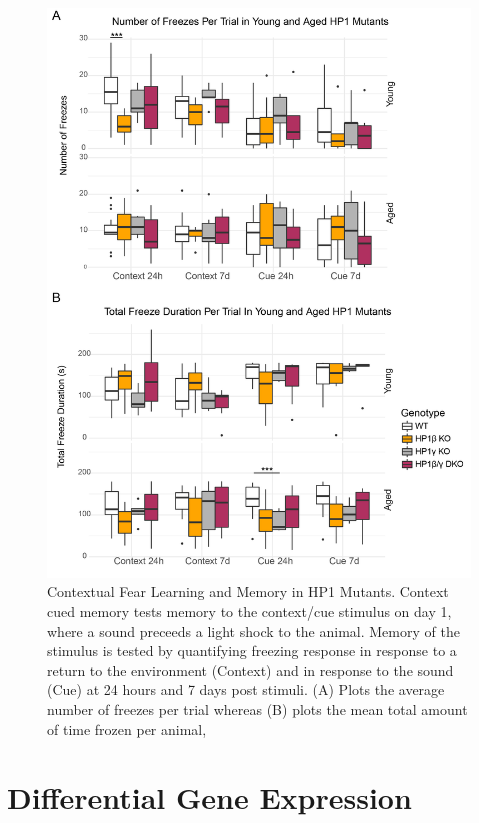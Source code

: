 \documentclass[onehalf,12pt]{beavtex}
\begin{document}
  \begin{figure}
  
  {\centering \includegraphics[width=0.95\linewidth, ]{./figure/results/Fear} 
  
  }
  
  \caption[Contextual Fear Learning and Memory in HP1 Mutants]{Contextual Fear Learning and Memory in HP1 Mutants. Context cued memory tests memory to the context/cue stimulus on day 1, where a sound preceeds a light shock to the animal.  Memory of the stimulus is tested by quantifying freezing response in response to a return to the environment (Context) and in response to the sound (Cue) at 24 hours and 7 days post stimuli. (A) Plots the average number of freezes per trial whereas (B) plots the mean total amount of time frozen per animal,}\label{fig:Fear}
  \end{figure}
  
  \FloatBarrier
  \clearpage
  
  \section{Differential Gene Expression}\label{DE}
  
\end{document}
